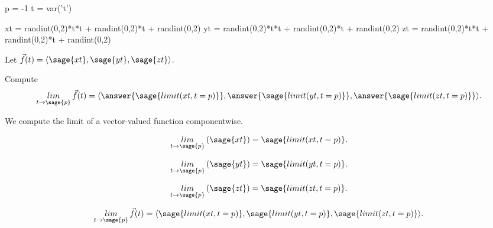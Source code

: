 \documentclass{ximera}
\author{Jim Fowler}
\begin{document}
\makerandom

\begin{sagesilent}
  p = -1
  t = var('t')
  
  xt = randint(0,2)*t*t + randint(0,2)*t + randint(0,2)
  yt = randint(0,2)*t*t + randint(0,2)*t + randint(0,2)
  zt = randint(0,2)*t*t + randint(0,2)*t + randint(0,2)
\end{sagesilent}

\begin{exercise}

  Let $\vec{f}(t) = \langle \sage{xt}, \sage{yt}, \sage{zt} \rangle$.

  Compute
  \[
    \mathop{lim}_{t \to \sage{p}} \vec{f}(t) = \langle \answer{\sage{limit(xt,t=p)}}, \answer{\sage{limit(yt,t=p)}}, \answer{\sage{limit(zt,t=p)}} \rangle.
  \]
  
  \begin{hint}
    We compute the limit of a vector-valued function componentwise.
  \end{hint}

  \begin{hint}
    \[\mathop{lim}_{t \to \sage{p}} \left( \sage{xt} \right) = \sage{limit(xt,t=p)}.\]
  \end{hint}

  \begin{hint}
    \[\mathop{lim}_{t \to \sage{p}} \left( \sage{yt} \right) = \sage{limit(yt,t=p)}.\]
  \end{hint}

  \begin{hint}
    \[\mathop{lim}_{t \to \sage{p}} \left( \sage{zt} \right) = \sage{limit(zt,t=p)}.\]
  \end{hint}
  
  \begin{hint}
    \[\mathop{lim}_{t \to \sage{p}} \vec{f}(t) = \langle \sage{limit(xt,t=p)}, \sage{limit(yt,t=p)}, \sage{limit(zt,t=p)} \rangle.\]
  \end{hint}          
  
\end{exercise}
\end{document}
